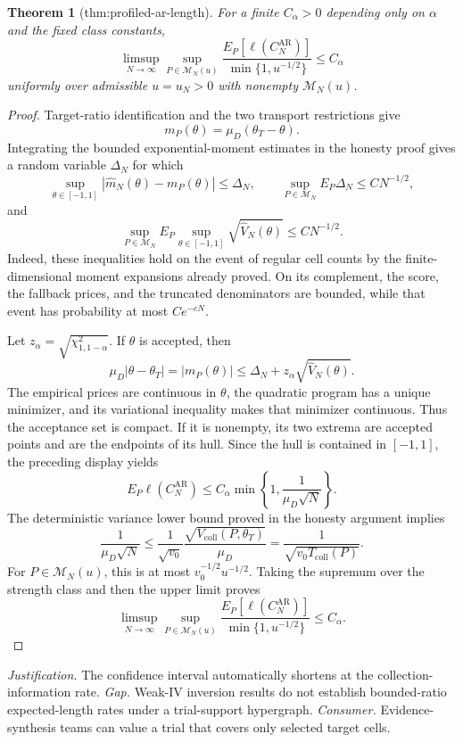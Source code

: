 \documentclass{article}
\newtheorem{theorem}{Theorem}
\begin{document}
\begin{theorem}[thm:profiled-ar-length]\label{thm:profiled-ar-length}
For a finite \(C_\alpha>0\) depending only on \(\alpha\) and the fixed class constants, \[\limsup_{N\to\infty}\sup_{P\in\mathcal M_N(u)}\frac{E_P[\ell(C_N^{\mathrm{AR}})]}{\min\{1,u^{-1/2}\}}\le C_\alpha\] uniformly over admissible \(u=u_N>0\) with nonempty \(\mathcal M_N(u)\).
\end{theorem}
\begin{proof}
Target-ratio identification and the two transport restrictions give
\[
 m_P(\theta)=\mu_D(\theta_T-\theta).
\]
Integrating the bounded exponential-moment estimates in the honesty proof gives a random variable \(\Delta_N\) for which
\[
 \sup_{\theta\in[-1,1]}|\widehat m_N(\theta)-m_P(\theta)|
 \le\Delta_N,
 \qquad
 \sup_{P\in\mathcal M_N}E_P\Delta_N\le CN^{-1/2},
\]
and
\[
 \sup_{P\in\mathcal M_N}
 E_P\sup_{\theta\in[-1,1]}\sqrt{\widehat V_N(\theta)}
 \le CN^{-1/2}.
\]
Indeed, these inequalities hold on the event of regular cell counts by the finite-dimensional moment expansions already proved. On its complement, the score, the fallback prices, and the truncated denominators are bounded, while that event has probability at most \(Ce^{-cN}\).

Let \(z_\alpha=\sqrt{\chi^2_{1,1-\alpha}}\). If \(\theta\) is accepted, then
\[
 \mu_D|\theta-\theta_T|
 =|m_P(\theta)|
 \le\Delta_N+z_\alpha\sqrt{\widehat V_N(\theta)}.
\]
The empirical prices are continuous in \(\theta\), the quadratic program has a unique minimizer, and its variational inequality makes that minimizer continuous. Thus the acceptance set is compact. If it is nonempty, its two extrema are accepted points and are the endpoints of its hull. Since the hull is contained in \([-1,1]\), the preceding display yields
\[
 E_P\ell(C_N^{\mathrm{AR}})
 \le C_\alpha\min\left\{1,\frac1{\mu_D\sqrt N}\right\}.
\]
The deterministic variance lower bound proved in the honesty argument implies
\[
 \frac1{\mu_D\sqrt N}
 \le\frac1{\sqrt{v_0}}
 \frac{\sqrt{V_{\mathrm{coll}}(P,\theta_T)}}{\mu_D}
 =\frac1{\sqrt{v_0T_{\mathrm{coll}}(P)}}.
\]
For \(P\in\mathcal M_N(u)\), this is at most \(v_0^{-1/2}u^{-1/2}\). Taking the supremum over the strength class and then the upper limit proves
\[
 \limsup_{N\to\infty}\sup_{P\in\mathcal M_N(u)}
 \frac{E_P[\ell(C_N^{\mathrm{AR}})]}{\min\{1,u^{-1/2}\}}
 \le C_\alpha.
\]
\end{proof}
\par\smallskip\noindent \textit{Justification.} The confidence interval automatically shortens at the collection-information rate. \textit{Gap.} Weak-IV inversion results do not establish bounded-ratio expected-length rates under a trial-support hypergraph. \textit{Consumer.} Evidence-synthesis teams can value a trial that covers only selected target cells.
\end{document}
